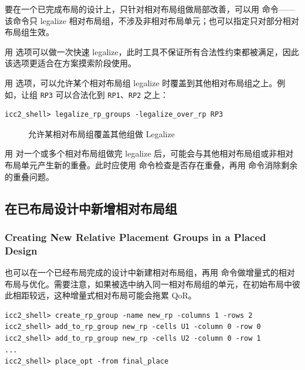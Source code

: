 要在一个已完成布局的设计上，只针对相对布局组做局部改善，可以用  命令——该命令只 legalize 相对布局组，不涉及非相对布局单元；也可以指定只对部分相对布局组生效。

用  选项可以做一次快速 legalize，此时工具不保证所有合法性约束都被满足，因此该选项更适合在方案摸索阶段使用。

用  选项，可以允许某个相对布局组 legalize 时覆盖到其他相对布局组之上。例如，让组 \texttt{RP3} 可以合法化到 \texttt{RP1}、\texttt{RP2} 之上：
\begin{lstlisting}
icc2_shell> legalize_rp_groups -legalize_over_rp RP3
\end{lstlisting}

\begin{figure}[htbp]
\centering
{}
\caption{允许某相对布局组覆盖其他组做 Legalize}
\label{fig:rp-legalize-over}
\end{figure}

用  对一个或多个相对布局组做完 legalize 后，可能会与其他相对布局组或非相对布局单元产生新的重叠。此时应使用  命令检查是否存在重叠，再用  命令消除剩余的重叠问题。

\subsection{在已布局设计中新增相对布局组}
\subsubsection*{Creating New Relative Placement Groups in a Placed Design}

也可以在一个已经布局完成的设计中新建相对布局组，再用  命令做增量式的相对布局与优化。需要注意，如果被选中纳入同一相对布局组的单元，在初始布局中彼此相距较远，这种增量式相对布局可能会拖累 QoR。

\begin{lstlisting}
icc2_shell> create_rp_group -name new_rp -columns 1 -rows 2
icc2_shell> add_to_rp_group new_rp -cells U1 -column 0 -row 0
icc2_shell> add_to_rp_group new_rp -cells U2 -column 0 -row 1
...
icc2_shell> place_opt -from final_place
\end{lstlisting}

